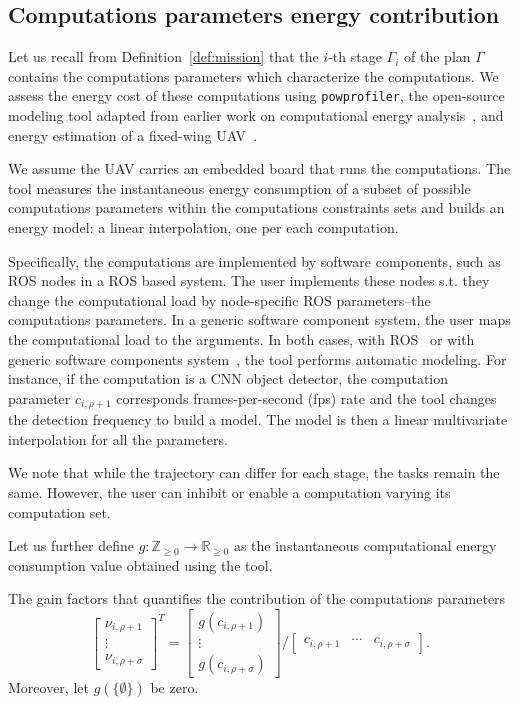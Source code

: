 \documentclass[letterpaper,10pt,conference]{ieeeconf}
\newcommand{\stt}[1]{{\small\tt #1}} %
\newcommand{\powprof}{\stt{powprofiler}}
\theoremstyle{definition}
\begin{document}
\subsection{Computations parameters energy contribution}
\label{sec:computations-model}

Let us recall from Definition~\ref{def:mission} that the $i$-th stage $\Gamma_i$ of the plan $\Gamma$ contains the computations parameters which characterize the computations. We assess the energy cost of these computations using \powprof{}, the open-source modeling tool adapted from earlier work on computational energy analysis~\cite{seewald2019coarse, seewald2019component}, and energy estimation of a fixed-wing UAV~\cite{seewald2020mechanical}. 

We assume the UAV carries an embedded board that runs the computations. The tool measures the instantaneous energy consumption of a subset of possible computations parameters within the computations constraints sets and builds an energy model: a linear interpolation, one per each computation. 

Specifically, the computations are implemented by software components, such as ROS nodes in a ROS based system. The user implements these nodes s.t. they change the computational load by node-specific ROS parameters--the computations parameters. In a generic software component system, the user maps the computational load to the arguments. In both cases, with ROS~\cite{zamanakos2020energy} or with generic software components system~\cite{seewald2019component}, the tool performs automatic modeling. For instance, if the computation is a CNN object detector, the computation parameter $c_{i,\rho+1}$ corresponds frames-per-second (fps) rate and the tool changes the detection frequency to build a model. The model is then a linear multivariate interpolation for all the parameters.

We note that while the trajectory can differ for each stage, the tasks remain the same. However, the user can inhibit or enable a computation varying its computation set.

Let us further define $g:\mathbb{Z}_{\geq 0}\rightarrow\mathbb{R}_{\geq 0}$ as the instantaneous computational energy consumption value obtained using the tool.

The gain factors that quantifies the contribution of the computations parameters
\begin{equation}\label{eq:energy-comp}
  \begin{bmatrix}\nu_{i,\rho+1} \\ \vdots \\ \nu_{i,\rho+\sigma}\end{bmatrix}^T=\begin{bmatrix}g(c_{i,\rho+1}) \\ \vdots \\ g(c_{i,\rho+\sigma})\end{bmatrix}/\begin{bmatrix}c_{i,\rho+1} & \cdots & c_{i,\rho+\sigma}\end{bmatrix}.
\end{equation}
Moreover, let $g(\{\emptyset\})$ be zero.
\end{document}
